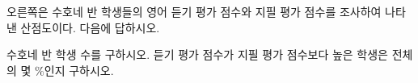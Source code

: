 \noindent\begin{minipage}[t]{0.58\linewidth}\vspace{0pt}\raggedright 오른쪽은 수호네 반 학생들의 영어 듣기 평가 점수와 지필 평가 점수를 조사하여 나타낸 산점도이다. 다음에 답하시오. \end{minipage}\hfill\begin{minipage}[t]{0.4\linewidth}\vspace{0pt}\centering \resizebox{\ifdim\width>\linewidth\linewidth\else\width\fi}{!}{}\end{minipage}\par
{} 수호네 반 학생 수를 구하시오.
 듣기 평가 점수가 지필 평가 점수보다 높은 학생은 전체의 몇 $\%$인지 구하시오.
